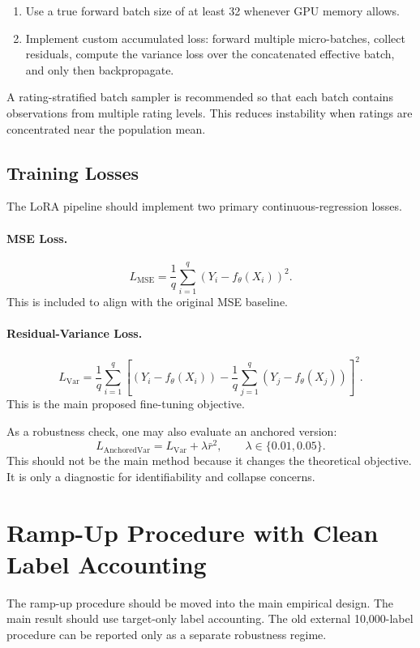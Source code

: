 \documentclass[11pt]{article}
\begin{document}
\begin{enumerate}
    \item Use a true forward batch size of at least 32 whenever GPU memory allows.
    \item Implement custom accumulated loss: forward multiple micro-batches, collect residuals, compute the variance loss over the concatenated effective batch, and only then backpropagate.
\end{enumerate}

A rating-stratified batch sampler is recommended so that each batch contains observations from multiple rating levels. This reduces instability when ratings are concentrated near the population mean.

\subsection{Training Losses}

The LoRA pipeline should implement two primary continuous-regression losses.

\paragraph{MSE Loss.}
\[
L_{\mathrm{MSE}}=\frac{1}{q}\sum_{i=1}^{q}\left(Y_i-f_\theta(X_i)\right)^2.
\]
This is included to align with the original MSE baseline.

\paragraph{Residual-Variance Loss.}
\[
L_{\mathrm{Var}}
=
\frac{1}{q}\sum_{i=1}^{q}
\left[
\left(Y_i-f_\theta(X_i)\right)
-
\frac{1}{q}\sum_{j=1}^{q}\left(Y_j-f_\theta(X_j)\right)
\right]^2.
\]
This is the main proposed fine-tuning objective.

As a robustness check, one may also evaluate an anchored version:
\[
L_{\mathrm{AnchoredVar}}=L_{\mathrm{Var}}+\lambda \bar r^2,
\qquad \lambda\in\{0.01,0.05\}.
\]
This should not be the main method because it changes the theoretical objective. It is only a diagnostic for identifiability and collapse concerns.

\section{Ramp-Up Procedure with Clean Label Accounting}

The ramp-up procedure should be moved into the main empirical design. The main result should use target-only label accounting. The old external 10,000-label procedure can be reported only as a separate robustness regime.
\end{document}
